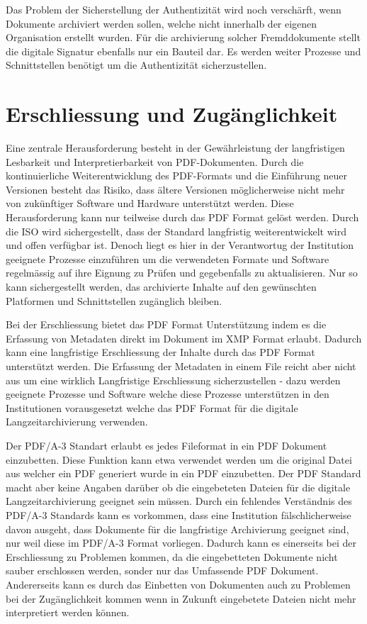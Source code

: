 \documentclass[a4paper,oneside, 12pt]{report}
\begin{document}
Das Problem der Sicherstellung der Authentizität wird noch verschärft, wenn Dokumente archiviert werden sollen, welche nicht innerhalb der eigenen Organisation erstellt wurden. Für die archivierung solcher Fremddokumente stellt die digitale Signatur ebenfalls nur ein Bauteil dar. Es werden weiter Prozesse und Schnittstellen benötigt um die Authentizität sicherzustellen.



\section{Erschliessung und Zugänglichkeit}
 Eine zentrale Herausforderung besteht in der Gewährleistung der langfristigen Lesbarkeit und Interpretierbarkeit von \ac{PDF}-Dokumenten. Durch die kontinuierliche Weiterentwicklung des \ac{PDF}-Formats und die Einführung neuer Versionen besteht das Risiko, dass ältere Versionen möglicherweise nicht mehr von zukünftiger Software und Hardware unterstützt werden. Diese Herausforderung kann nur teilweise durch das PDF Format gelöst werden. Durch die \ac{ISO} wird sichergestellt, dass der Standard langfristig weiterentwickelt wird und offen verfügbar ist. Denoch liegt es hier in der Verantwortug der Institution geeignete Prozesse einzuführen um die verwendeten Formate und Software regelmässig auf ihre Eignung zu Prüfen und gegebenfalls zu aktualisieren. Nur so kann sichergestellt werden, das archivierte Inhalte auf den gewünschten Platformen und Schnittstellen zugänglich bleiben. 

 Bei der Erschliessung bietet das PDF Format Unterstützung indem es die Erfassung von Metadaten direkt im Dokument im \ac{XMP} Format erlaubt. Dadurch kann eine langfristige Erschliessung der Inhalte durch das PDF Format unterstützt werden. Die Erfassung der Metadaten in einem File reicht aber nicht aus um eine wirklich Langfristige Erschliessung sicherzustellen - dazu werden geeignete Prozesse und Software welche diese Prozesse unterstützen in den Institutionen vorausgesetzt welche das PDF Format für die digitale Langzeitarchivierung verwenden.

 Der PDF/A-3 Standart erlaubt es jedes Fileformat in ein PDF Dokument einzubetten. Diese Funktion kann etwa verwendet werden um die original Datei aus welcher ein PDF generiert wurde in ein PDF einzubetten. Der PDF Standard macht aber keine Angaben darüber ob die eingebeteten Dateien für die digitale Langzeitarchivierung geeignet sein müssen. Durch ein fehlendes Verständnis des PDF/A-3 Standards kann es vorkommen, dass eine Institution fälschlicherweise davon ausgeht, dass Dokumente für die langfristige Archivierung geeignet sind, nur weil diese im PDF/A-3 Format vorliegen. Dadurch kann es einerseits bei der Erschliessung zu Problemen kommen, da die eingebetteten Dokumente nicht sauber erschlossen werden, sonder nur das Umfassende PDF Dokument. Andererseits kann es durch das Einbetten von Dokumenten auch zu Problemen bei der Zugänglichkeit kommen wenn in Zukunft eingebetete Dateien nicht mehr interpretiert werden können.
\end{document}

